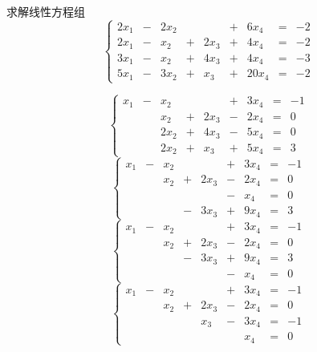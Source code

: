 \begin{li}
  求解线性方程组
  $$
  \left\{
    \begin{array}{rcrcrcrcrr}
      2x_1 & - & 2x_2 &   &      & + &  6x_4 & = &-2 \\[0.1cm]
      2x_1 & - &  x_2 & + & 2x_3 & + &  4x_4 & = &-2 \\[0.1cm]
      3x_1 & - &  x_2 & + & 4x_3 & + &  4x_4 & = &-3 \\[0.1cm]
      5x_1 & - & 3x_2 & + &  x_3 & + & 20x_4 & = &-2 
    \end{array}
  \right.
  $$
\end{li}
\begin{jie}
  $$
  \left\{
    \begin{array}{rcrcrcrcrr}
      x_1 & - &  x_2 &   &      & + &  3x_4 & = &-1 \\[0.1cm]
          &  &  x_2 & + & 2x_3 & - &  2x_4 & = &0 \\[0.1cm]
          &  & 2x_2 & + & 4x_3 & - &  5x_4 & = &0 \\[0.1cm]
          &  & 2x_2 & + &  x_3 & + &  5x_4 & = &3 
    \end{array}
  \right.
  $$    
  $$
  \left\{
    \begin{array}{rcrcrcrcrr}
      x_1 & - &  x_2 &   &      & + &  3x_4 & = &-1 \\[0.1cm]
          &  &  x_2 & + & 2x_3 & - &  2x_4 & = &0 \\[0.1cm]
          &  &  &  &  & - &  x_4 & = &0 \\[0.1cm]
          &  &  & - &  3x_3 & + &  9x_4 & = &3 
    \end{array}
  \right.
  $$    
  $$
  \left\{
    \begin{array}{rcrcrcrcrr}
      x_1 & - &  x_2 &   &      & + &  3x_4 & = &-1 \\[0.1cm]
          &  &  x_2 & + & 2x_3 & - &  2x_4 & = &0 \\[0.1cm]
          &  &  & - &  3x_3 & + &  9x_4 & = &3 \\[0.1cm]
          &  &  &  &  & - &  x_4 & = &0 
    \end{array}
  \right.
  $$    
  $$
  \left\{
    \begin{array}{rcrcrcrcrr}
      x_1 & - &  x_2 &   &      & + &  3x_4 & = &-1 \\[0.1cm]
          &  &  x_2 & + & 2x_3 & - &  2x_4 & = &0 \\[0.1cm]
          &  &  &  &  x_3 & - &  3x_4 & = &-1 \\[0.1cm]
          &  &  &  &  &  &  x_4 & = &0 

\end{array}$$
\end{jie}
